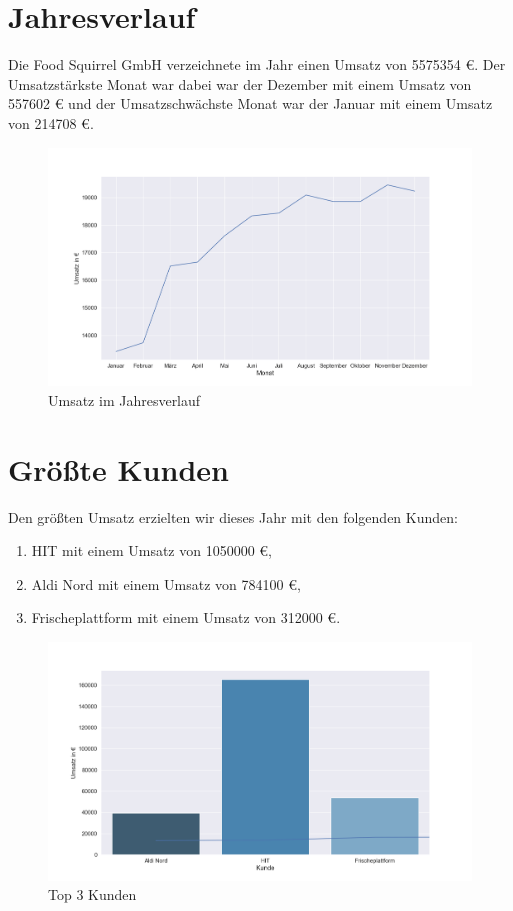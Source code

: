 \documentclass[10pt,a4paper]{article}
\author{Hannes Benne}
\begin{document}
\section*{Jahresverlauf}
Die Food Squirrel GmbH verzeichnete im Jahr \the\year{} einen Umsatz von 5575354 \euro{}. Der Umsatzstärkste Monat war dabei war der Dezember mit einem Umsatz von 557602 \euro{} und der Umsatzschwächste Monat war der Januar mit einem Umsatz von 214708 \euro.
\begin{figure}[h]
\centering
    \includegraphics[width=1.\textwidth]{img/Jahresumsatz.png}
\caption{Umsatz im Jahresverlauf} 
\end{figure}

\section*{Größte Kunden}
Den größten Umsatz erzielten wir dieses Jahr mit den folgenden Kunden:
\begin{enumerate}
\item HIT mit einem Umsatz von 1050000 \euro,
\item Aldi Nord mit einem Umsatz von 784100 \euro,
\item Frischeplattform mit einem Umsatz von 312000 \euro.
\end{enumerate}
\newpage

\begin{figure}[h]
\centering
    \includegraphics[width=1\textwidth]{img/top_kunden.png}
\caption{Top 3 Kunden} 
\end{figure}
\end{document}
